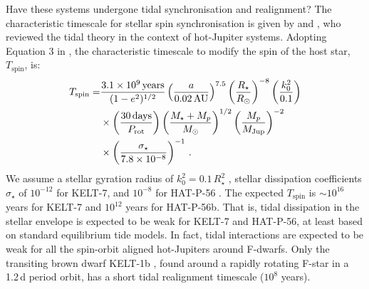 \documentclass[useAMS,usenatbib]{mn2e}
\begin{document}
Have these systems undergone tidal synchronisation and realignment? The characteristic timescale for stellar spin synchronisation is given by \citet{2010ApJ...723..285H} and \citet{2012ApJ...757....6H}, who reviewed the tidal theory in the context of hot-Jupiter systems. Adopting Equation 3 in \citet{2012ApJ...757....6H}, the characteristic timescale to modify the spin of the host star, $T_\text{spin}$, is:
\begin{align}
  T_\text{spin} =& \frac{3.1\times10^9\,\text{years}}{(1-e^2)^{1/2}} \left(\frac{a}{0.02 \,\text{AU}} \right)^{7.5} \left( \frac{R_\star}{R_\odot}\right)^{-8} \left( \frac{k_0^2}{0.1} \right) \notag\\
  &\times \left( \frac{30 \,\text{days}}{P_\text{rot}} \right) \left(\frac{M_\star + M_p}{M_\odot} \right)^{1/2} \left(\frac{M_p}{M_\text{Jup}} \right)^{-2} \notag\\
  &\times \left( \frac{\sigma_\star}{7.8\times10^{-8}} \right)^{-1}\,.
\end{align}
We assume a stellar gyration radius of $k_0^2=0.1\,R_\star ^2$ \citep{2000MNRAS.315..543H}, stellar dissipation coefficients $\sigma_\star$ of $10^{-12}$ for KELT-7, and $10^{-8}$ for  HAT-P-56 \citep[from Figure 3 of][]{2012ApJ...757....6H}. The expected $T_\text{spin}$ is $\sim 10^{16}$ years for KELT-7 and $10^{12}$ years for HAT-P-56b. That is, tidal dissipation in the stellar envelope is expected to be weak for KELT-7 and HAT-P-56, at least based on standard equilibrium tide models. In fact, tidal interactions are expected to be weak for all the spin-orbit aligned hot-Jupiters around F-dwarfs. Only the transiting brown dwarf KELT-1b \citep{2012ApJ...761..123S}, found around a rapidly rotating F-star in a 1.2\,d period orbit, has a short tidal realignment timescale ($10^8$ years). 
\end{document}
